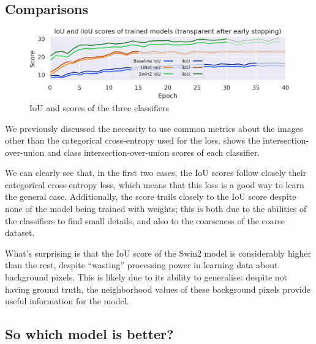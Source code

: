 \newpage{}

\subsection{Comparisons}
\label{comparison_section}

\begin{figure}[h]
	\centering
	\includegraphics[width=.8\textwidth]{iou_scores.png}
	\caption{IoU and \iiouc{} scores of the three classifiers}
	\label{comparisons}
\end{figure}

We previously discussed the necessity to use common metrics about the images other than the categorical cross-entropy used for the loss.
 shows the intersection-over-union and class intersection-over-union scores of each classifier.


We can clearly see that, in the first two cases, the IoU scores follow closely their categorical cross-entropy loss, which means that this loss is a good way to learn the general case.
Additionally, the \iiouc{} score trails closely to the IoU score despite none of the model being trained with weights; this is both due to the abilities of the classifiers to find small details, and also to the coarseness of the coarse dataset.

What's surprising is that the IoU score of the Swin2 model is considerably higher than the rest, despite ``wasting'' processing power in learning data about background pixels.
This is likely due to its ability to generalise: despite not having ground truth, the neighborhood values of these background pixels provide useful information for the model.

\subsection{So which model is better?}
\label{which_one_wins}

